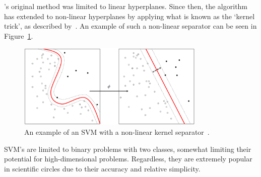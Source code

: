\citeauthor{vapnik1995support}'s original method was limited to linear hyperplanes. Since then, the algorithm has extended to non-linear hyperplanes by applying what is known as the `kernel trick', as described by~\cite{amari1999improving}. An example of such a non-linear separator can be seen in Figure~\ref{fig:chap2-svm-nonlinear}.

\begin{figure}
  \centering
  \includegraphics[width=0.8\textwidth]{figures/chapter2/svm_nonlinear}
  \caption[An example of an SVM with a non-linear kernel separator.]{An example of an SVM with a non-linear kernel separator~\citep{kernel-wiki-pic}.}
\label{fig:chap2-svm-nonlinear}
\end{figure}

SVM's are limited to  binary problems with two classes, somewhat limiting their potential for high-dimensional problems. Regardless, they are extremely popular in scientific circles due to their accuracy and relative simplicity. 
